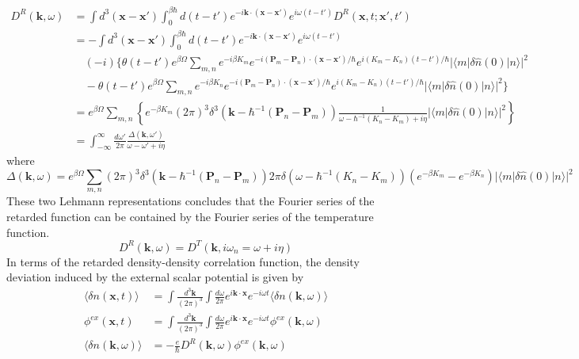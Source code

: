 \begin{equation}
\begin{aligned}
D^R(\mathbf k,\omega)&=\int d^3(\mathbf x-\mathbf x')\int _0^{\beta\hbar}d(t-t')e^{-i\mathbf k\cdot(\mathbf x-\mathbf x')}e^{i\omega (t-t')}D^R(\mathbf x,t;\mathbf x',t')\\
&=-\int d^3(\mathbf x-\mathbf x')\int _0^{\beta\hbar}d(t-t')e^{-i\mathbf k\cdot(\mathbf x-\mathbf x')}e^{i\omega (t-t')}\\
&\quad (-i)\Big\{ \theta(t-t') e^{\beta\Omega} \sum_{m,n}e^{-i\beta K_m} e^{-i(\mathbf P_m-\mathbf P_n)\cdot(\mathbf x-\mathbf x')/\hbar} e^{i(K_m-K_n)(t-t')/\hbar} |\langle m|\delta\hat n(0)|n\rangle|^2\\
& \quad-\theta(t-t') e^{\beta\Omega} \sum_{m,n}e^{-i\beta K_n} e^{-i(\mathbf P_m-\mathbf P_n)\cdot(\mathbf x-\mathbf x')/\hbar} e^{i(K_m-K_n)(t-t')/\hbar} |\langle m|\delta\hat n(0)|n\rangle|^2\Big\}\\
&=e^{\beta\Omega} \sum_{m,n}\left\{ e^{-\beta K_m} (2\pi)^3 \delta^3(\mathbf k-\hbar^{-1}(\mathbf P_n-\mathbf P_m))\frac{1}{\omega-\hbar^{-1}(K_n-K_m)+i\eta}|\langle m|\delta \hat n(0)|n\rangle|^2\right\}\\
&=\int_{-\infty}^{\infty}\frac{d\omega'}{2\pi}\frac{\Delta(\mathbf k,\omega')}{\omega-\omega'+i\eta}
\end{aligned}
\end{equation}
where
\begin{equation}
\Delta(\mathbf k,\omega)=e^{\beta\Omega}\sum_{m,n} (2\pi)^3 \delta^3(\mathbf k-\hbar^{-1}(\mathbf P_n-\mathbf P_m)) 2\pi\delta(\omega-\hbar^{-1}(K_n-K_m))(e^{-\beta K_m}-e^{-\beta K_n}) |\langle m|\delta \hat n(0)|n\rangle|^2
\end{equation}
 These two Lehmann representations concludes that the Fourier series of the retarded function can be contained by the Fourier series of the temperature function.
\begin{equation}\label{eq4.9.9}
D^R(\mathbf k,\omega)=D^T(\mathbf k,i\omega_n=\omega+i\eta)
\end{equation}
 In terms of the retarded density-density correlation function, the density deviation induced by the external scalar potential is given by
\begin{equation}\label{eq4.9.10}
\begin{aligned}
\langle \delta n(\mathbf x,t)\rangle &=\int \frac{d^3\mathbf k}{(2\pi)^3}\int \frac{d\omega}{2\pi} e^{i\mathbf k\cdot \mathbf x}e^{-i\omega t}\langle \delta n(\mathbf k,\omega)\rangle\\
\phi ^{ex}(\mathbf x,t)&=\int \frac{d^3\mathbf k}{(2\pi)^3}\int \frac{d\omega}{2\pi} e^{i\mathbf k\cdot \mathbf x}e^{-i\omega t} \phi ^{ex}(\mathbf k,\omega)\\
\langle \delta n(\mathbf k,\omega)\rangle&=-\frac{e}{\hbar}D^R(\mathbf k,\omega)\phi^{ex}(\mathbf k,\omega)
\end{aligned}
\end{equation}
